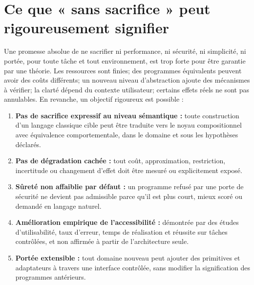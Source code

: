 \documentclass[11pt,a4paper]{article}
\begin{document}
\section{Ce que « sans sacrifice » peut rigoureusement signifier}
Une promesse absolue de ne sacrifier ni performance, ni sécurité, ni simplicité, ni portée, pour toute tâche et tout environnement, est trop forte pour être garantie par une théorie. Les ressources sont finies; des programmes équivalents peuvent avoir des coûts différents; un nouveau niveau d'abstraction ajoute des mécanismes à vérifier; la clarté dépend du contexte utilisateur; certains effets réels ne sont pas annulables. En revanche, un objectif rigoureux est possible :
\begin{enumerate}
\item \textbf{Pas de sacrifice expressif au niveau sémantique :} toute construction d'un langage classique cible peut être traduite vers le noyau compositionnel avec équivalence comportementale, dans le domaine et sous les hypothèses déclarés.
\item \textbf{Pas de dégradation cachée :} tout coût, approximation, restriction, incertitude ou changement d'effet doit être mesuré ou explicitement exposé.
\item \textbf{Sûreté non affaiblie par défaut :} un programme refusé par une porte de sécurité ne devient pas admissible parce qu'il est plus court, mieux scoré ou demandé en langage naturel.
\item \textbf{Amélioration empirique de l'accessibilité :} démontrée par des études d'utilisabilité, taux d'erreur, temps de réalisation et réussite sur tâches contrôlées, et non affirmée à partir de l'architecture seule.
\item \textbf{Portée extensible :} tout domaine nouveau peut ajouter des primitives et adaptateurs à travers une interface contrôlée, sans modifier la signification des programmes antérieurs.
\end{enumerate}
\end{document}
